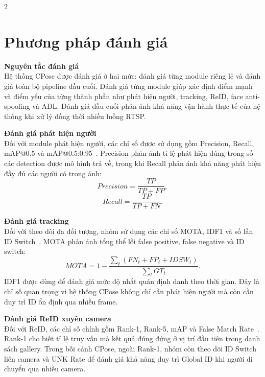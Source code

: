 \documentclass[a4paper, twoside, 12pt]{article}
\begin{document}
\begin{multicols}{2}
\section{Phương pháp đánh giá}
\vspace{-0.6cm}

\hspace*{0.5cm}\textbf{Nguyên tắc đánh giá}\\
Hệ thống CPose được đánh giá ở hai mức: đánh giá từng module riêng lẻ và đánh giá toàn bộ pipeline đầu cuối. Đánh giá từng module giúp xác định điểm mạnh và điểm yếu của từng thành phần như phát hiện người, tracking, ReID, face anti-spoofing và ADL. Đánh giá đầu cuối phản ánh khả năng vận hành thực tế của hệ thống khi xử lý đồng thời nhiều luồng RTSP.

\vspace{0.1cm}
\hspace*{0.5cm}\textbf{Đánh giá phát hiện người}\\
Đối với module phát hiện người, các chỉ số được sử dụng gồm Precision, Recall, mAP@0.5 và mAP@0.5:0.95~\cite{lin2014coco}. Precision phản ánh tỉ lệ phát hiện đúng trong số các detection được mô hình trả về, trong khi Recall phản ánh khả năng phát hiện đầy đủ các người có trong ảnh:
\begin{equation}
Precision=\frac{TP}{TP+FP},
\end{equation}
\begin{equation}
Recall=\frac{TP}{TP+FN}.
\end{equation}

\vspace{0.1cm}
\hspace*{0.5cm}\textbf{Đánh giá tracking}\\
Đối với theo dõi đa đối tượng, nhóm sử dụng các chỉ số MOTA, IDF1 và số lần ID Switch~\cite{bernardin2008mota}. MOTA phản ánh tổng thể lỗi false positive, false negative và ID switch:
\begin{equation}
MOTA=1-\frac{\sum_t(FN_t+FP_t+IDSW_t)}{\sum_t GT_t}.
\label{eq:mota}
\end{equation}
IDF1 được dùng để đánh giá mức độ nhất quán định danh theo thời gian. Đây là chỉ số quan trọng vì hệ thống CPose không chỉ cần phát hiện người mà còn cần duy trì ID ổn định qua nhiều frame.

\vspace{0.1cm}
\hspace*{0.5cm}\textbf{Đánh giá ReID xuyên camera}\\
Đối với ReID, các chỉ số chính gồm Rank-1, Rank-5, mAP và False Match Rate~\cite{zheng2015market1501,ye2021deep}. Rank-1 cho biết tỉ lệ truy vấn mà kết quả đúng đứng ở vị trí đầu tiên trong danh sách gallery. Trong bối cảnh CPose, ngoài Rank-1, nhóm còn theo dõi ID Switch liên camera và UNK Rate để đánh giá khả năng duy trì Global ID khi người di chuyển qua nhiều camera.


\end{multicols}
\end{document}
